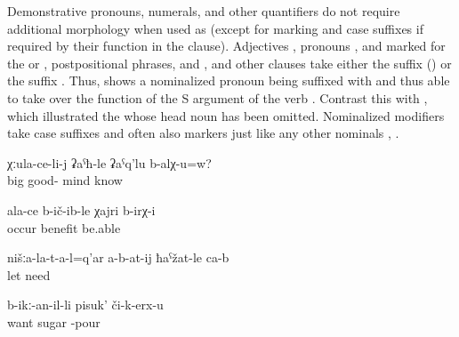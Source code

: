 Demonstrative pronouns, numerals, and other quantifiers do not require additional morphology when used as  (except for  marking and case suffixes if required by their function in the clause). Adjectives , pronouns , and  marked for the   or , postpositional phrases, and  , and other clauses take either the suffix  () or the suffix . Thus,  shows a nominalized  pronoun being suffixed with  and thus able to take over the function of the S argument of the verb . Contrast this with , which illustrated the  whose head noun has been omitted. Nominalized modifiers take case suffixes and often also  markers just like any other nominals , .
%
\begin{exe}

	\ex	\label{ex:Does an older (person) know it better, (or a young guy)}
	\gll	χːula-ce-li-j	ʡaˁħ-le	ʡaˁq'lu	b-alχ-u=w?\\
		big	good-	mind	know\\
	\glt	{}

	\ex	\label{ex:(I) could profit from yours}
	\gll	ala-ce	b-ič-ib-le	χajri	b-irχ-i\\
			occur	benefit	be.able\\
	\glt	{}
	
	\ex	\label{ex:‎‎‎Ours should not be let. (i.e. our people should not be allowed to sell our land)}
	\gll	nišːa-la-t-a-l=q'ar	a-b-at-ij	ħaˁžat-le	ca-b\\
			let	need	\\
	\glt	{}

	\ex	\label{ex:Who wants to pours sugar (on the dish)}
	\gll	b-ikː-an-il-li	pisuk'	či-k-erx-u\\
		want	sugar	-pour\\
	\glt	{}
\end{exe}

